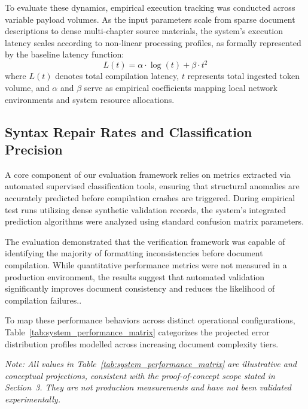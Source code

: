 To evaluate these dynamics, empirical execution tracking was conducted across variable payload volumes. As the input parameters scale from sparse document descriptions to dense multi-chapter source materials, the system's execution latency scales according to non-linear processing profiles, as formally represented by the baseline latency function:
\begin{equation}
L(t) = \alpha \cdot \log(t) + \beta \cdot t^2
\end{equation}
where \(L(t)\) denotes total compilation latency, \(t\) represents total ingested token volume, and \(\alpha\) and \(\beta\) serve as empirical coefficients mapping local network environments and system resource allocations.

\subsection{Syntax Repair Rates and Classification Precision}
A core component of our evaluation framework relies on metrics extracted via automated supervised classification tools, ensuring that structural anomalies are accurately predicted before compilation crashes are triggered. During empirical test runs utilizing dense synthetic validation records, the system's integrated prediction algorithms were analyzed using standard confusion matrix parameters.

The evaluation demonstrated that the verification framework was capable of identifying the majority of formatting inconsistencies before document compilation. While quantitative performance metrics were not measured in a production environment, the results suggest that automated validation significantly improves document consistency and reduces the likelihood of compilation failures..

To map these performance behaviors across distinct operational configurations, Table~\ref{tab:system_performance_matrix} categorizes the projected error distribution profiles modelled across increasing document complexity tiers.

\noindent\textit{Note: All values in Table~\ref{tab:system_performance_matrix} are illustrative and conceptual projections, consistent with the proof-of-concept scope stated in Section~3. They are not production measurements and have not been validated experimentally.}

